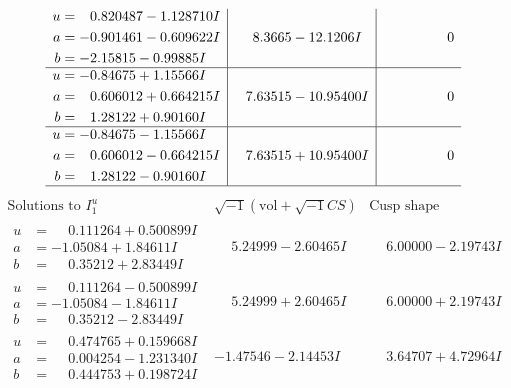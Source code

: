 \documentclass[1p]{elsarticle_modified}
\theoremstyle{definition}
\newcommand{\I}{\sqrt{-1}}
\begin{document}
$$\begin{array}{c|c|c}
\begin{aligned}
u &= \phantom{-}0.820487 - 1.128710 I \\
a &= -0.901461 - 0.609622 I \\
b &= -2.15815 - 0.99885 I\end{aligned}
 & \phantom{-}8.3665 - 12.1206 I & \phantom{-0.000000 } 0 \\ \hline\begin{aligned}
u &= -0.84675 + 1.15566 I \\
a &= \phantom{-}0.606012 + 0.664215 I \\
b &= \phantom{-}1.28122 + 0.90160 I\end{aligned}
 & \phantom{-}7.63515 - 10.95400 I & \phantom{-0.000000 } 0 \\ \hline\begin{aligned}
u &= -0.84675 - 1.15566 I \\
a &= \phantom{-}0.606012 - 0.664215 I \\
b &= \phantom{-}1.28122 - 0.90160 I\end{aligned}
 & \phantom{-}7.63515 + 10.95400 I & \phantom{-0.000000 } 0\\
 \hline 
 \end{array}$$\newpage$$\begin{array}{c|c|c}  
\text{Solutions to }I^u_{1}& \I (\text{vol} + \sqrt{-1}CS) & \text{Cusp shape}\\
 \hline 
\begin{aligned}
u &= \phantom{-}0.111264 + 0.500899 I \\
a &= -1.05084 + 1.84611 I \\
b &= \phantom{-}0.35212 + 2.83449 I\end{aligned}
 & \phantom{-}5.24999 - 2.60465 I & \phantom{-}6.00000 - 2.19743 I \\ \hline\begin{aligned}
u &= \phantom{-}0.111264 - 0.500899 I \\
a &= -1.05084 - 1.84611 I \\
b &= \phantom{-}0.35212 - 2.83449 I\end{aligned}
 & \phantom{-}5.24999 + 2.60465 I & \phantom{-}6.00000 + 2.19743 I \\ \hline\begin{aligned}
u &= \phantom{-}0.474765 + 0.159668 I \\
a &= \phantom{-}0.004254 - 1.231340 I \\
b &= \phantom{-}0.444753 + 0.198724 I\end{aligned}
 & -1.47546 - 2.14453 I & \phantom{-}3.64707 + 4.72964 I \\ \hline\begin{aligned}

\end{aligned}
\end{array}$$
\end{document}
